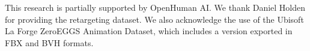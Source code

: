 
%

 \begin{acks}
     	This research is partially supported by OpenHuman AI. We thank Daniel Holden for providing the retargeting dataset. We also acknowledge the use of the Ubisoft La Forge ZeroEGGS Animation Dataset, which includes a version exported in FBX and BVH formats.
 \end{acks}
  